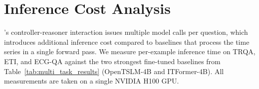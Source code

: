 \section{Inference Cost Analysis}
\label{app:inference_cost}

\algoname's controller-reasoner interaction issues multiple model calls per question, which introduces additional inference cost compared to baselines that process the time series in a single forward pass. We measure per-example inference time on TRQA, ETI, and ECG-QA against the two strongest fine-tuned baselines from Table~\ref{tab:multi_task_results} (OpenTSLM-4B and ITFormer-4B). All measurements are taken on a single NVIDIA H100 GPU.

